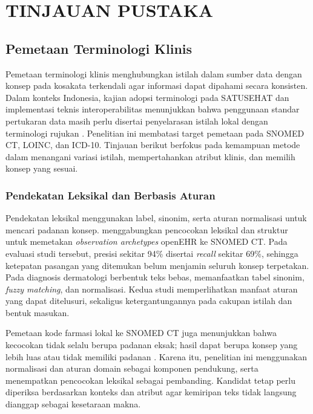 \chapter{TINJAUAN PUSTAKA}

\section{Pemetaan Terminologi Klinis}
\label{sec:tinjauan-pemetaan-klinis}

Pemetaan terminologi klinis menghubungkan istilah dalam sumber data dengan konsep pada kosakata terkendali agar informasi dapat dipahami secara konsisten. Dalam konteks Indonesia, kajian adopsi terminologi pada SATUSEHAT dan implementasi teknis interoperabilitas menunjukkan bahwa penggunaan standar pertukaran data masih perlu disertai penyelarasan istilah lokal dengan terminologi rujukan \citep{ayuningtyas_bringing_2025,heryawan_fast_2025}. Penelitian ini membatasi target pemetaan pada SNOMED CT, LOINC, dan ICD-10. Tinjauan berikut berfokus pada kemampuan metode dalam menangani variasi istilah, mempertahankan atribut klinis, dan memilih konsep yang sesuai.

\subsection{Pendekatan Leksikal dan Berbasis Aturan}

Pendekatan leksikal menggunakan label, sinonim, serta aturan normalisasi untuk mencari padanan konsep. \citet{meizoso_automated_2011} menggabungkan pencocokan leksikal dan struktur untuk memetakan \textit{observation archetypes} openEHR ke SNOMED CT. Pada evaluasi studi tersebut, presisi sekitar 94\% disertai \textit{recall} sekitar 69\%, sehingga ketepatan pasangan yang ditemukan belum menjamin seluruh konsep terpetakan. Pada diagnosis dermatologi berbentuk teks bebas, \citet{sitaru_digitalising_2024} memanfaatkan tabel sinonim, \textit{fuzzy matching}, dan normalisasi. Kedua studi memperlihatkan manfaat aturan yang dapat ditelusuri, sekaligus ketergantungannya pada cakupan istilah dan bentuk masukan.

Pemetaan kode farmasi lokal ke SNOMED CT juga menunjukkan bahwa kecocokan tidak selalu berupa padanan eksak; hasil dapat berupa konsep yang lebih luas atau tidak memiliki padanan \citep{jung_mapping_2022}. Karena itu, penelitian ini menggunakan normalisasi dan aturan domain sebagai komponen pendukung, serta menempatkan pencocokan leksikal sebagai pembanding. Kandidat tetap perlu diperiksa berdasarkan konteks dan atribut agar kemiripan teks tidak langsung dianggap sebagai kesetaraan makna.

